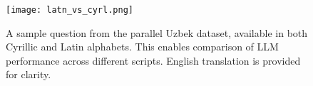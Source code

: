 \begin{figure}
    \centering
    \texttt{[image: latn\_vs\_cyrl.png]}
    \caption{A sample question from the parallel Uzbek dataset, available in both Cyrillic and Latin alphabets. This enables comparison of LLM performance across different scripts. English translation is provided for clarity.}
    \label{fig:dual_dataset}
\end{figure}